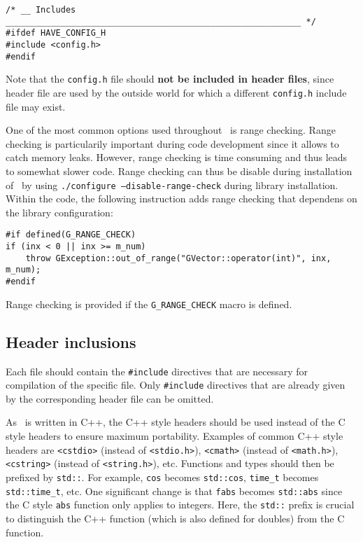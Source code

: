 \documentclass{article}[12pt,a4]
\begin{document}
\begin{verbatim}
/* __ Includes ___________________________________________________________ */
#ifdef HAVE_CONFIG_H
#include <config.h>
#endif
\end{verbatim}

Note that the {\tt config.h} file should {\bf not be included in header files}, since header file
are used by the outside world for which a different {\tt config.h} include file may exist.

One of the most common options used throughout \this\ is range checking.
Range checking is particularily important during code development since it allows to catch
memory leaks.
However, range checking is time consuming and thus leads to somewhat slower code.
Range checking can thus be disable during installation of \this\ by using
{\tt ./configure --disable-range-check} during library installation.
Within the code, the following instruction adds range checking that dependens on
the library configuration:

\begin{verbatim}
#if defined(G_RANGE_CHECK)
if (inx < 0 || inx >= m_num)
    throw GException::out_of_range("GVector::operator(int)", inx, m_num);
#endif
\end{verbatim}

Range checking is provided if the {\tt G\_RANGE\_CHECK} macro is defined.


\subsection{Header inclusions}

Each file should contain the {\tt \#include} directives that are necessary for compilation of
the specific file.
Only {\tt \#include} directives that are already given by the corresponding header file can
be omitted.

As \this\ is written in C++, the C++ style headers should be used instead of the C style
headers to ensure maximum portability.
Examples of common C++ style headers are
{\tt <cstdio>} (instead of {\tt <stdio.h>}),
{\tt <cmath>} (instead of {\tt <math.h>}),
{\tt <cstring>} (instead of {\tt <string.h>}), etc.
Functions and types should then be prefixed by {\tt std::}.
For example,
{\tt cos} becomes {\tt std::cos},
{\tt time\_t} becomes {\tt std::time\_t}, etc.
One significant change is that {\tt fabs} becomes {\tt std::abs} since
the C style {\tt abs} function only applies to integers.
Here, the {\tt std::} prefix is crucial to distinguish the C++ function (which is
also defined for doubles) from the C function.
\end{document}
